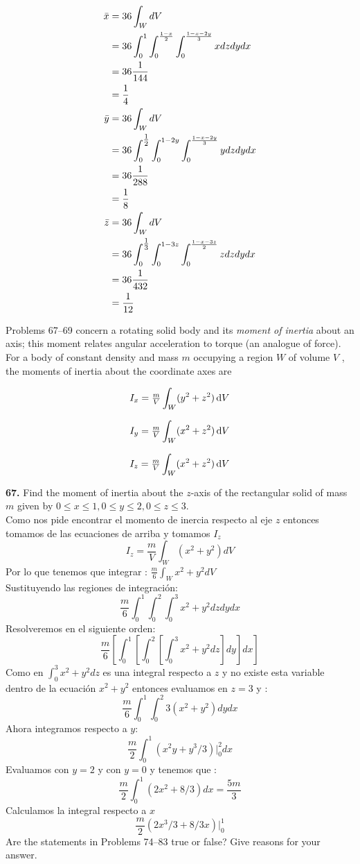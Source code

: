 \documentclass[11pt]{report}
\begin{document}
\begin{equation}
	\begin{split}
		\bar{x}&=36\int_WdV\\
			   &=36\int_0^1\int_0^{\frac{1-x}{2}}\int_0^{\frac{1-x-2y}{3}}xdzdydx\\
			   &=36\frac{1}{144}\\
			   &=\frac{1}{4}\\
		\bar{y}&=36\int_WdV\\
			   &=36\int_0^{\tfrac{1}{2}}\int_0^{1-2y}\int_0^{\frac{1-x-2y}{3}}ydzdydx\\
			   &=36\frac{1}{288}\\
			   &=\frac{1}{8}\\
		\bar{z}&=36\int_WdV\\
			   &=36\int_0^{\tfrac{1}{3}}\int_0^{1-3z}\int_0^{\frac{1-x-3z}{2}}zdzdydx\\
			   &=36\frac{1}{432}\\
			   &=\frac{1}{12}\\
	\end{split}
\end{equation}


Problems 67–69 concern a rotating solid body and its \textit{moment of inertia}
about an axis; this moment relates angular acceleration to torque (an analogue
of force). For a body of constant density and mass $m$ occupying a region $W$
of volume $V$ , the moments of inertia about the coordinate axes are

\[I_x = \tfrac{m}{V} \int _W (y^2 + z^2) \, \text d V \]

\[I_y = \tfrac{m}{V} \int _W (x^2 + z^2) \, \text d V \]

\[I_z = \tfrac{m}{V} \int _W (x^2 + z^2) \, \text d V \]

\textbf{67.} Find the moment of inertia about the $z$-axis of the rectangular
solid of mass $m$ given by $0 \leq x \leq 1, 0 \leq y \leq 2, 0 \leq z \leq 3$. \\

Como nos  pide encontrar el momento de inercia respecto al eje $z$ entonces tomamos de las ecuaciones de arriba y tomamos $I_z$
\[I_{z} = \frac{m}{V} \int_W (x^2+y^2) dV\]
Por lo que tenemos que integrar : $\frac{m}{6} \int_W x^2+ y^2 dV$\\
Sustituyendo las regiones de integración:
\[\frac{m}{6} \int_0^1 \int_0^2 \int_0^3 x^2 + y^2 dz dy dx\]
Resolveremos en el siguiente orden:
\[\frac{m}{6} \left[ \int_0^1\left[ \int_0^2\left[ \int_0^3 x^2 + y^2 dz \right] dy \right] dx \right] \]
Como en $\int_0 ^3 x^2+ y^2 dz$ es una integral respecto a $z$ y no existe esta variable dentro
de la ecuación $x^2+ y^2$ entonces evaluamos en $z = 3$ y :
\[\frac{m}{6} \int_0^1 \int_0^2 3\left( x^2+y^2 \right) dy dx\]
Ahora integramos respecto a $y$:
\[\frac{m}{2} \int_0^1 \left( x^2y+ y^3/3 \right) \vert_0^2 dx\]
Evaluamos con $y= 2$ y con $y= 0$ y tenemos que :
\[\frac{m}{2} \int_0^1 \left( 2x^2+ 8/3 \right) dx = \frac{5m}{3}\]
Calculamos la integral respecto a $x$
\[\frac{m}{2} \left( 2x^3/3 + 8/3 x \right) \vert_0^1\]
Are the statements in Problems 74–83 true or false? Give reasons for your answer. \\
\end{document}

